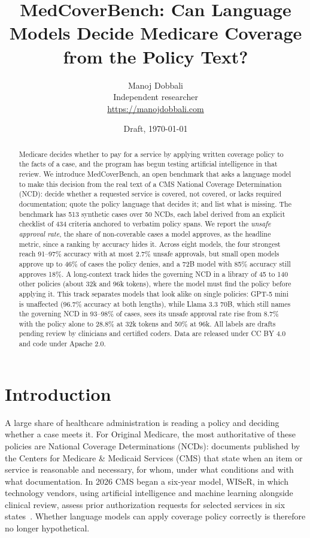 \documentclass[11pt]{article}
\title{MedCoverBench: Can Language Models Decide Medicare Coverage\\from the Policy Text?}
\author{Manoj Dobbali\\Independent researcher\\\url{https://manojdobbali.com}}
\date{Draft, \today}
\begin{document}
\maketitle

\begin{abstract}
Medicare decides whether to pay for a service by applying written coverage policy to the facts of a
case, and the program has begun testing artificial intelligence in that review. We introduce
MedCoverBench, an open benchmark that asks a language model to make this decision from the real
text of a CMS National Coverage Determination (NCD): decide whether a requested service is
covered, not covered, or lacks required documentation; quote the policy language that decides
it; and list what is missing. The benchmark has 513 synthetic cases over 50 NCDs, each label
derived from an explicit checklist of 434 criteria anchored to verbatim policy spans. We report
the \emph{unsafe approval rate}, the share of non-coverable cases a model approves, as the
headline metric, since a ranking by accuracy hides it. Across eight models, the four strongest
reach 91--97\% accuracy with at most 2.7\% unsafe approvals, but small open models approve up to
46\% of cases the policy denies, and a 72B model with 85\% accuracy still approves 18\%. A
long-context track hides the governing NCD in a library of 45 to 140 other policies (about 32k
and 96k tokens), where the model must find the policy before applying it. This track separates
models that look alike on single policies: GPT-5 mini is unaffected (96.7\% accuracy at both
lengths), while Llama 3.3 70B, which still names the governing NCD in 93--98\% of cases, sees its
unsafe approval rate rise from 8.7\% with the policy alone to 28.8\% at 32k tokens and 50\% at 96k. All labels are drafts pending review by clinicians and
certified coders. Data are released under CC BY 4.0 and code under Apache 2.0.
\end{abstract}

\section{Introduction}

A large share of healthcare administration is reading a policy and deciding whether a case meets
it. For Original Medicare, the most authoritative of these policies are National Coverage
Determinations (NCDs): documents published by the Centers for Medicare \& Medicaid Services (CMS)
that state when an item or service is reasonable and necessary, for whom, under what conditions
and with what documentation. In 2026 CMS began a six-year model, WISeR, in which technology
vendors, using artificial intelligence and machine learning alongside clinical review, assess
prior authorization requests for selected services in six states~\citep{cms2025wiser}. Whether
language models can apply coverage policy correctly is therefore no longer hypothetical.
\end{document}
